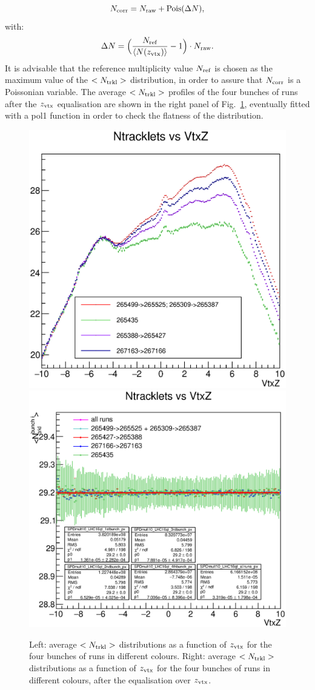\begin{equation} 
\label{eq:NtrklCorr}
N_{\rm corr} = N_{\rm raw} + {\rm Pois}(\Delta N),
\end{equation}
with:
\begin{equation} 
\label{eq:NtrklCorr}
\Delta N = \Big (\frac{N_{\rm ref}}{\langle N(z_{\rm vtx}) \rangle} -1 \Big ) \cdot N_{\rm raw}.
\end{equation}
 It is advisable that the reference multiplicity value $N_{\rm ref}$ is chosen as the
 maximum value of the $<N_{\rm trkl}>$ distribution, in order to assure
 that $N_{\rm corr}$ is a Poissonian variable. 
The average $<N_{\rm trkl}>$ profiles of the four bunches of runs 
after the $z_{\rm vtx}$ equalisation are shown in the right panel of 
Fig.~\ref{fig:FourBunches}, eventually fitted with a pol1 function in order
to check the flatness of the distribution. 

\begin{figure}[h]
\centering
 \includegraphics[width=.49\textwidth]{FigCap6/NtrkVsZVtx_FinalWeights.eps}
 \includegraphics[width=.49\textwidth]{FigCap6/NtrkProfilesDataAfterZVxtEqual.eps}
 \caption{Left: average $<N_{\rm trkl}>$ distributions as a function of $z_{\rm vtx}$ for the four bunches of runs in different colours. Right: average $<N_{\rm trkl}>$ distributions as a function of $z_{\rm vtx}$ for the four bunches of runs in different colours, after the equalisation over $z_{\rm vtx}$.}
 \label{fig:FourBunches}
\end{figure}

